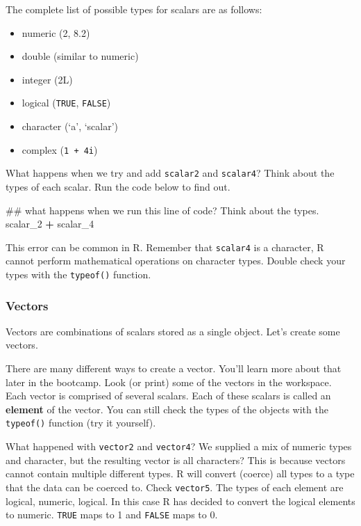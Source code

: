 \documentclass[]{article}
\newenvironment{Shaded}{\begin{snugshade}}{\end{snugshade}}
\newcommand{\DecValTok}[1]{\textcolor[rgb]{0.00,0.00,0.81}{#1}}
\newcommand{\StringTok}[1]{\textcolor[rgb]{0.31,0.60,0.02}{#1}}
\newcommand{\OperatorTok}[1]{\textcolor[rgb]{0.81,0.36,0.00}{\textbf{#1}}}
\newcommand{\NormalTok}[1]{#1}
\providecommand{\tightlist}{%
  \setlength{\itemsep}{0pt}\setlength{\parskip}{0pt}}
\begin{document}
The complete list of possible types for scalars are as follows:

\begin{itemize}
\tightlist
\item
  numeric (2, 8.2)
\item
  double (similar to numeric)
\item
  integer (2L)
\item
  logical (\texttt{TRUE}, \texttt{FALSE})
\item
  character (`a', `scalar')
\item
  complex (\texttt{1\ +\ 4i})
\end{itemize}

What happens when we try and add \texttt{scalar2} and \texttt{scalar4}?
Think about the types of each scalar. Run the code below to find out.

\begin{Shaded}
\begin{Highlighting}[]
\NormalTok{## what happens when we run this line of code? Think about the types.}
\NormalTok{scalar_}\DecValTok{2} \OperatorTok{+}\StringTok{ }\NormalTok{scalar_}\DecValTok{4}
\end{Highlighting}
\end{Shaded}

This error can be common in R. Remember that \texttt{scalar4} is a
character, R cannot perform mathematical operations on character types.
Double check your types with the \texttt{typeof()} function.

\subsubsection{Vectors}\label{vectors}

Vectors are combinations of scalars stored as a single object. Let's
create some vectors.

There are many different ways to create a vector. You'll learn more
about that later in the bootcamp. Look (or print) some of the vectors in
the workspace. Each vector is comprised of several scalars. Each of
these scalars is called an \textbf{element} of the vector. You can still
check the types of the objects with the \texttt{typeof()} function (try
it yourself).

What happened with \texttt{vector2} and \texttt{vector4}? We supplied a
mix of numeric types and character, but the resulting vector is all
characters? This is because vectors cannot contain multiple different
types. R will convert (coerce) all types to a type that the data can be
coerced to. Check \texttt{vector5}. The types of each element are
logical, numeric, logical. In this case R has decided to convert the
logical elements to numeric. \texttt{TRUE} maps to 1 and \texttt{FALSE}
maps to 0.
\end{document}
